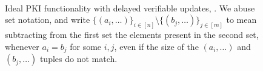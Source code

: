 \begin{figure}
\begin{framed}
{\begin{minipage}[t]{0.5\textwidth}
        \vspace*{0.15em} \\

      \end{minipage}
    }
  \end{framed}
  \caption{Ideal PKI functionality with delayed verifiable updates,
    \IdealGPKIDID. We abuse set notation, and write $\lbrace (a_i,\dots)
    \rbrace_{i\in[n]} \setminus \lbrace (b_j,\dots) \rbrace_{j\in[m]}$ to mean
    subtracting from the first set the elements present in the second set,
    whenever $a_i = b_j$ for some $i,j$, even if the size of the $(a_i,\dots)$
    and $(b_j,\dots)$ tuples do not match.}
  \label{fig:fpkidid}
\end{figure}


